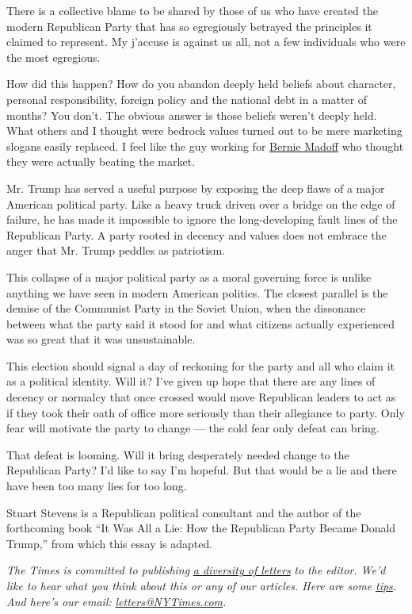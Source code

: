 There is a collective blame to be shared by those of us who have created
the modern Republican Party that has so egregiously betrayed the
principles it claimed to represent. My j'accuse is against us all, not a
few individuals who were the most egregious.

How did this happen? How do you abandon deeply held beliefs about
character, personal responsibility, foreign policy and the national debt
in a matter of months? You don't. The obvious answer is those beliefs
weren't deeply held. What others and I thought were bedrock values
turned out to be mere marketing slogans easily replaced. I feel like the
guy working for
\href{https://www.nytimes3xbfgragh.onion/topic/person/bernard-l-madoff}{Bernie
Madoff} who thought they were actually beating the market.

Mr. Trump has served a useful purpose by exposing the deep flaws of a
major American political party. Like a heavy truck driven over a bridge
on the edge of failure, he has made it impossible to ignore the
long-developing fault lines of the Republican Party. A party rooted in
decency and values does not embrace the anger that Mr. Trump peddles as
patriotism.

This collapse of a major political party as a moral governing force is
unlike anything we have seen in modern American politics. The closest
parallel is the demise of the Communist Party in the Soviet Union, when
the dissonance between what the party said it stood for and what
citizens actually experienced was so great that it was unsustainable.

This election should signal a day of reckoning for the party and all who
claim it as a political identity. Will it? I've given up hope that there
are any lines of decency or normalcy that once crossed would move
Republican leaders to act as if they took their oath of office more
seriously than their allegiance to party. Only fear will motivate the
party to change --- the cold fear only defeat can bring.

That defeat is looming. Will it bring desperately needed change to the
Republican Party? I'd like to say I'm hopeful. But that would be a lie
and there have been too many lies for too long.

Stuart Stevens is a Republican political consultant and the author of
the forthcoming book ``It Was All a Lie: How the Republican Party Became
Donald Trump,'' from which this essay is adapted.

\emph{The Times is committed to publishing}
\href{https://www.nytimes3xbfgragh.onion/2019/01/31/opinion/letters/letters-to-editor-new-york-times-women.html}{\emph{a
diversity of letters}} \emph{to the editor. We'd like to hear what you
think about this or any of our articles. Here are some}
\href{https://help.nytimes3xbfgragh.onion/hc/en-us/articles/115014925288-How-to-submit-a-letter-to-the-editor}{\emph{tips}}\emph{.
And here's our email:}
\href{mailto:letters@NYTimes.com}{\emph{letters@NYTimes.com}}\emph{.}

